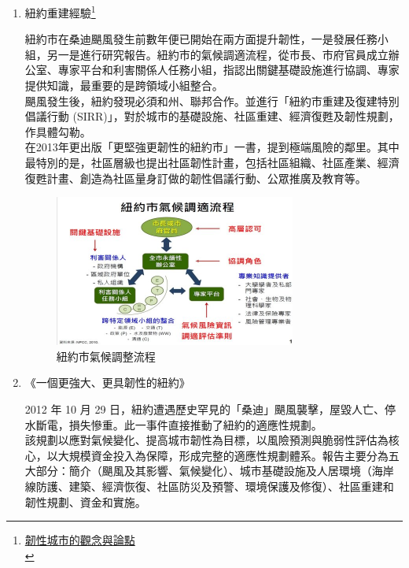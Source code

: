 \documentclass[a4paper,12pt]{article}
\begin{document}
\begin{enumerate}
\begin{enumerate}
\item 紐約重建經驗\footnote{\href{http://www.yucc.org.tw/news/domestic/20150302-1}{韌性城市的觀念與論點 }\\}
\label{sec:orgab034cb}

紐約市在桑迪颶風發生前數年便已開始在兩方面提升韌性，一是發展任務小組，另一是進行研究報告。紐約市的氣候調適流程，從市長、市府官員成立辦公室、專家平台和利害關係人任務小組，指認出關鍵基礎設施進行協調、專家提供知識，最重要的是跨領域小組整合。\\

颶風發生後，紐約發現必須和州、聯邦合作。並進行「紐約市重建及復建特別倡議行動 (SIRR)」，對於城市的基礎設施、社區重建、經濟復甦及韌性規劃，作具體勾勒。\\

在2013年更出版「更堅強更韌性的紐約市」一書，提到極端風險的鄰里。其中最特別的是，社區層級也提出社區韌性計畫，包括社區組織、社區產業、經濟復甦計畫、創造為社區量身訂做的韌性倡議行動、公眾推廣及教育等。\\

\begin{figure}[htbp]
\centering
\includegraphics[width=300]{images/7d107d045e026c2350198abf90696d417a0b1.jpg}
\caption{\label{fig:NY2}紐約市氣候調整流程}
\end{figure}

\item 《一個更強大、更具韌性的紐約》
\label{sec:org04b168c}

2012 年 10 月 29 日，紐約遭遇歷史罕見的「桑迪」颶風襲擊，屋毀人亡、停水斷電，損失慘重。此一事件直接推動了紐約的適應性規劃。\\

該規劃以應對氣候變化、提高城市韌性為目標，以風險預測與脆弱性評估為核心，以大規模資金投入為保障，形成完整的適應性規劃體系。報告主要分為五大部分：簡介（颶風及其影響、氣候變化）、城市基礎設施及人居環境（海岸線防護、建築、經濟恢復、社區防災及預警、環境保護及修復）、社區重建和韌性規劃、資金和實施。\\


\end{enumerate}
\end{enumerate}
\end{document}
